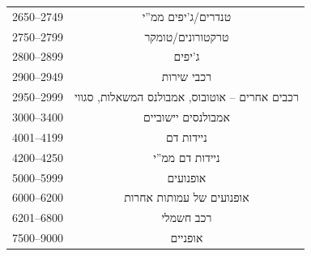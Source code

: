 \documentclass{article}
\begin{document}
\begin{table}[H]
\begin{tabular}{cc}
           2650–2749 & טנדרים/ג'יפים ממ''י                           \\
           2750–2799 & טרקטורונים/טומקר                            \\
           2800–2899 & ג'יפים                                      \\
           2900–2949 & רכבי שירות                                  \\
           2950–2999 & רכבים אחרים – אוטובוס, אמבולנס המשאלות, סגווי \\
           3000–3400 & אמבולנסים יישוביים                            \\
           4001–4199 & ניידות דם                                   \\
           4200–4250 & ניידות דם ממ''י                              \\
           5000–5999 & אופנועים                                    \\
           6000–6200 & אופנועים של עמותות אחרות                     \\
           6201–6800 & רכב חשמלי                                  \\
           7500–9000 & אופניים                                    \\
        \bottomrule
\end{tabular}
\end{table}
\end{document}
